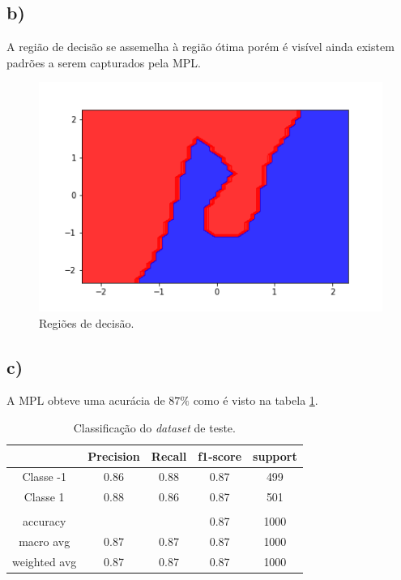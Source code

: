 \documentclass{article}
\begin{document}
    \subsection*{b)}
    A região de decisão se assemelha à região ótima porém é visível ainda existem padrões
    a serem capturados pela MPL.
    \begin{figure}[H]
        \centering
        \includegraphics[width=\linewidth]{mpl_decision.png}   
        \caption{Regiões de decisão.}
        \label{fig:mpl_decision}
    \end{figure}

    \subsection*{c)}
    A MPL obteve uma acurácia de $87\%$ como é visto na tabela \ref{tbl:mpl_test}.
    \begin{table}[H]
        \begin{tabular}{c|c|c|c|c|}
        \cline{2-5}
                                        & \textbf{Precision} & \textbf{Recall} & \textbf{f1-score} & \textbf{support} \\ \hline
        \multicolumn{1}{|c|}{Classe -1}    & 0.86               & 0.88            & 0.87              & 499              \\ \hline
        \multicolumn{1}{|c|}{Classe 1}     & 0.88               & 0.86            & 0.87              & 501              \\ \hline
        \multicolumn{1}{|c|}{}             &                    &                 &                   &                  \\ \hline
        \multicolumn{1}{|c|}{accuracy}     &                    &                 & 0.87              & 1000             \\ \hline
        \multicolumn{1}{|c|}{macro avg}    & 0.87               & 0.87            & 0.87              & 1000             \\ \hline
        \multicolumn{1}{|c|}{weighted avg} & 0.87               & 0.87            & 0.87              & 1000             \\ \hline
        \end{tabular}
        \caption{Classificação do \textit{dataset} de teste.}
        \label{tbl:mpl_test}
    \end{table}
\end{document}
